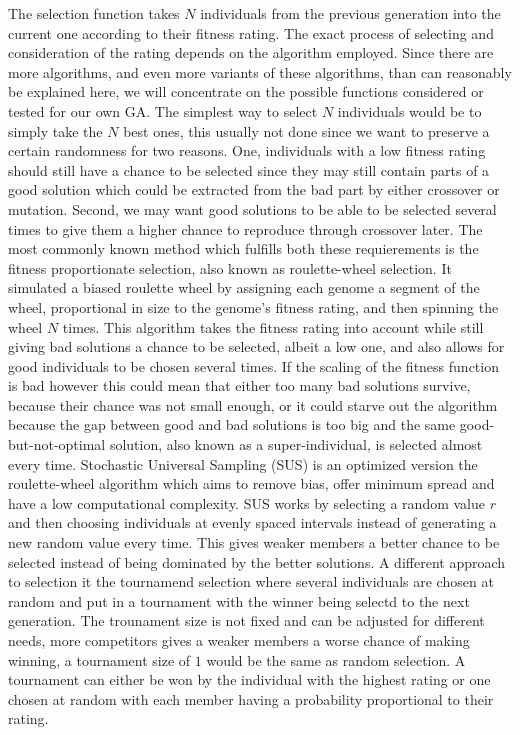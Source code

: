 The selection function takes $N$ individuals from the previous generation into the current one according to their fitness rating. The exact process of selecting and consideration of the rating depends on the algorithm employed. Since there are more algorithms, and even more variants of these algorithms, than can reasonably be explained here, we will concentrate on the possible functions considered or tested for our own GA. The simplest way to select $N$ individuals would be to simply take the $N$ best ones, this usually not done since we want to preserve a certain randomness for two reasons. One, individuals with a low fitness rating should still have a chance to be selected since they may still contain parts of a good solution which could be extracted from the bad part by either crossover or mutation. Second, we may want good solutions to be able to be selected several times to give them a higher chance to reproduce through crossover later. The most commonly known method which fulfills both these requierements is the fitness proportionate selection\cite{16}, also known as roulette-wheel selection. It simulated a biased roulette wheel by assigning each genome a segment of the wheel, proportional in size to the genome's fitness rating, and then spinning the wheel $N$ times. This algorithm takes the fitness rating into account while still giving bad solutions a chance to be selected, albeit a low one, and also allows for good individuals to be chosen several times.  If the scaling of the fitness function is bad however this could mean that either too many bad solutions survive, because their chance was not small enough, or it could starve out the algorithm because the gap between good and bad solutions is too big and the same good-but-not-optimal solution, also known as a super-individual, is selected almost every time. Stochastic Universal Sampling (SUS) is an optimized version the roulette-wheel algorithm which aims to remove bias, offer minimum spread and have a low computational complexity. SUS works by selecting a random value $r$ and then choosing individuals at evenly spaced intervals instead of generating a new random value every time. This gives weaker members a better chance to be selected instead of being dominated by the better solutions.\cite{17} A different approach to selection it the tournamend selection where several individuals are chosen at random and put in a tournament with the winner being selectd to the next generation. The trounament size is not fixed and can be adjusted for different needs, more competitors gives a weaker members a worse chance of making winning, a tournament size of $1$ would be the same as random selection. A tournament can either be won by the individual with the highest rating or one chosen at random with each member having a probability proportional to their rating.

